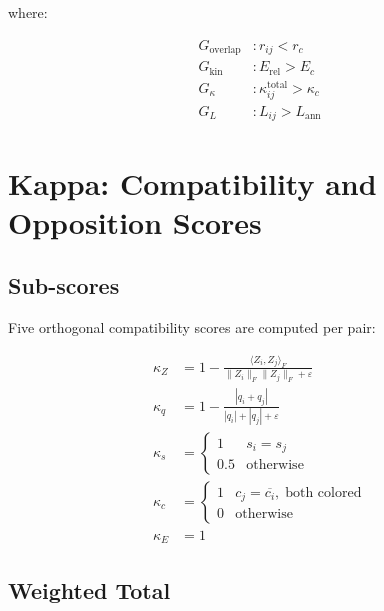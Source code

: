 \documentclass[11pt,a4paper]{article}
\theoremstyle{defbox}
\begin{document}
where:

\begin{align}
  G_{\mathrm{overlap}} &: r_{ij} < r_c \\
  G_{\mathrm{kin}}     &: E_{\mathrm{rel}} > E_c \\
  G_\kappa             &: \kappa_{ij}^{\mathrm{total}} > \kappa_c \\
  G_L                  &: L_{ij} > L_{\mathrm{ann}}
\end{align}

\section{Kappa: Compatibility and Opposition Scores}
\label{sec:kappa}

\subsection{Sub-scores}

Five orthogonal compatibility scores are computed per pair:

\begin{align}
  \kappa_Z &= 1 - \frac{\langle Z_i, Z_j\rangle_F}{\|Z_i\|_F\|Z_j\|_F+\varepsilon}
  \tag{matrix opposition} \\[4pt]
  \kappa_q &= 1 - \frac{|q_i + q_j|}{|q_i|+|q_j|+\varepsilon}
  \tag{charge complementarity} \\[4pt]
  \kappa_s &=
	\begin{cases} 1 & s_i = s_j \\ 0.5 & \text{otherwise} \end{cases}
  \tag{spin compatibility} \\[4pt]
  \kappa_c &=
	\begin{cases}
	  1 & c_j = \overline{c_i},\; \text{both colored} \\
	  0 & \text{otherwise}
	\end{cases}
  \tag{color/anticolor match} \\[4pt]
  \kappa_E &= 1
  \tag{energy availability (placeholder)}
\end{align}

\subsection{Weighted Total}
\end{document}
